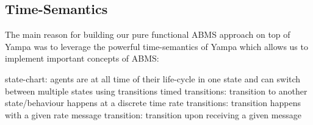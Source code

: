 \subsection{Time-Semantics}
The main reason for building our pure functional ABMS approach on top of Yampa was to leverage the powerful time-semantics of Yampa which allows us to implement important concepts of ABMS:

state-chart: agents are at all time of their life-cycle in one state and can switch between multiple states using transitions 
timed transitions: transition to another state/behaviour happens at a discrete time
rate transitions: transition happens with a given rate
message transition: transition upon receiving a given message 